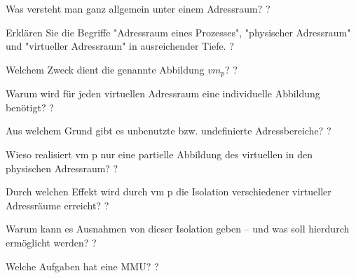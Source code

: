 \documentclass[avery5371]{flashcards}
\begin{document}
\begin{flashcard}[Speichermanagement]{Was versteht man ganz allgemein unter einem Adressraum? }
    ?
\end{flashcard}

\begin{flashcard}[Speichermanagement]{Erklären Sie die Begriffe "Adressraum eines Prozesses", "physischer Adressraum" und "virtueller Adressraum" in ausreichender Tiefe. }
    ?
\end{flashcard}

\begin{flashcard}[Speichermanagement]{Welchem Zweck dient die genannte Abbildung $vm_p$? }
    ?
\end{flashcard}

\begin{flashcard}[Speichermanagement]{Warum wird für jeden virtuellen Adressraum eine individuelle Abbildung benötigt?}
    ?
\end{flashcard}

\begin{flashcard}[Speichermanagement]{Aus welchem Grund gibt es unbenutzte bzw. undefinierte Adressbereiche? }
    ?
\end{flashcard}

\begin{flashcard}[Speichermanagement]{Wieso realisiert vm p nur eine partielle Abbildung des virtuellen in den physischen Adressraum? }
    ?
\end{flashcard}

\begin{flashcard}[Speichermanagement]{Durch welchen Effekt wird durch vm p die Isolation verschiedener virtueller Adressräume erreicht? }
    ?
\end{flashcard}

\begin{flashcard}[Speichermanagement]{Warum kann es Ausnahmen von dieser Isolation geben – und was soll hierdurch ermöglicht werden? }
    ?
\end{flashcard}

\begin{flashcard}[Speichermanagement]{Welche Aufgaben hat eine MMU? }
    ?
\end{flashcard}
\end{document}
